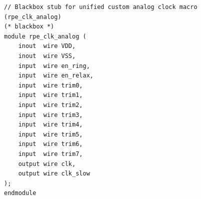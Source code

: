 \documentclass[10pt,a4paper]{article}
\begin{document}
\begin{lstlisting}[basicstyle=\ttfamily\scriptsize,aboveskip=0pt,belowskip=0pt,caption={Verilog synthesis blackbox view (\texttt{analog/clk\_macro/layout/rpe\_clk\_analog.v}).}]
// Blackbox stub for unified custom analog clock macro (rpe_clk_analog)
(* blackbox *)
module rpe_clk_analog (
    inout  wire VDD,
    inout  wire VSS,
    input  wire en_ring,
    input  wire en_relax,
    input  wire trim0,
    input  wire trim1,
    input  wire trim2,
    input  wire trim3,
    input  wire trim4,
    input  wire trim5,
    input  wire trim6,
    input  wire trim7,
    output wire clk,
    output wire clk_slow
);
endmodule
\end{lstlisting}
\end{document}
